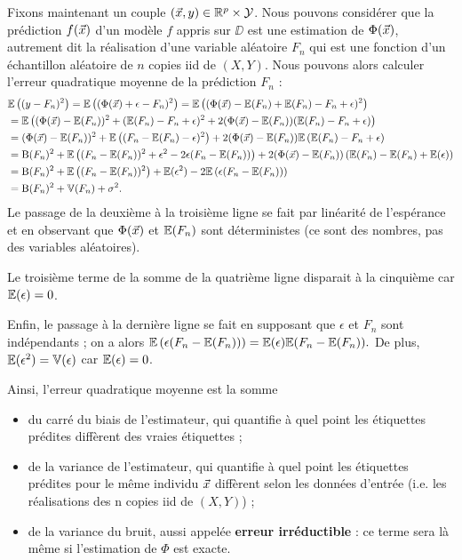 Fixons maintenant un couple $(\xx, y) \in \RR^p \times \YY$. Nous pouvons
considérer que la prédiction $f(\xx)$ d'un modèle $f$ appris sur $\DD$ est une
estimation de $\Phi(\xx)$, autrement dit la réalisation d'une variable aléatoire
$F_n$ qui est une fonction d'un échantillon aléatoire de $n$ copies iid de
$(X, Y)$. Nous pouvons alors calculer l'erreur quadratique moyenne de la
prédiction $F_n$ :
\begin{align*}
  & \EE\left((y-F_n)^2\right)  = \EE\left((\Phi(\xx) + \epsilon - F_n)^2   \right)
   = \EE\left((\Phi(\xx) - \EE(F_n) + \EE(F_n) - F_n  + \epsilon )^2   \right) \\
  & = \EE\left((\Phi(\xx) - \EE(F_n))^2 + (\EE(F_n) - F_n  + \epsilon )^2 + 2
    (\Phi(\xx) - \EE(F_n))(\EE(F_n) - F_n  + \epsilon) \right) \\
  & = (\Phi(\xx) - \EE(F_n))^2 + \EE\left((F_n - \EE(F_n) - \epsilon )^2  \right) + 2
    (\Phi(\xx) - \EE(F_n))  \EE\left( \EE(F_n) - F_n  + \epsilon \right) \\
  & =  \text{B}(F_n)^2  + 
    \EE \left((F_n - \EE(F_n))^2 + \epsilon^2 - 2 \epsilon (F_n - \EE(F_n)) \right) + 2
    (\Phi(\xx) - \EE(F_n))  \left( \EE(F_n) - \EE(F_n)  + \EE(\epsilon) \right) \\
  & =  \text{B}(F_n)^2  + 
    \EE \left((F_n - \EE(F_n))^2 \right) + \EE(\epsilon^2) - 2 \EE\left(\epsilon (F_n - \EE(F_n)) \right) \\
    & = \text{B}(F_n)^2 + \VV(F_n) + \sigma^2.
\end{align*}
Le passage de la deuxième à la troisième ligne se fait par linéarité de
l'espérance et en observant que $\Phi(\xx)$ et $\mathbb{E}(F_n)$ sont déterministes
(ce sont des nombres, pas des variables aléatoires).

Le troisième terme de la somme de la quatrième ligne disparait à la cinquième
car $\mathbb{E}(\epsilon)=0$.

Enfin, le passage à la dernière ligne se fait en supposant que $\epsilon$ et
$F_n$ sont indépendants ; on a alors
$\mathbb{E}\left(\epsilon (F_n - \mathbb{E}(F_n)) \right) = \mathbb{E}(\epsilon) \mathbb{E}(F_n -
\mathbb{E}(F_n)).$ De plus, $\mathbb{E}(\epsilon^2) = \mathbb{V}(\epsilon)$ car $\mathbb{E}(\epsilon)=0$.

Ainsi, l'erreur quadratique moyenne est la somme
\begin{itemize}
\item du carré du biais de l'estimateur, qui quantifie à quel point les étiquettes prédites diffèrent des vraies étiquettes ;
\item de la variance de l'estimateur, qui quantifie à quel point les étiquettes
  prédites pour le même individu $\xx$ diffèrent selon les données d'entrée
  (i.e. les réalisations des n copies iid de $(X, Y)$) ;
\item de la variance du bruit, aussi appelée \textbf{erreur irréductible} : ce terme sera là même si l'estimation de $\Phi$ est exacte.
\end{itemize}


